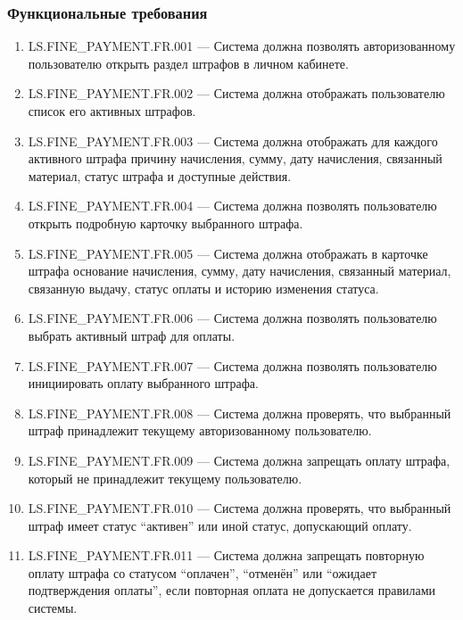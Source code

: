 \documentclass[12pt,a4paper]{article}
\begin{document}
	\subsubsection{Функциональные требования}
	
	\begin{enumerate}
		\item LS.FINE\_PAYMENT.FR.001 --- Система должна позволять авторизованному пользователю
		открыть раздел штрафов в личном кабинете.
		
		\item LS.FINE\_PAYMENT.FR.002 --- Система должна отображать пользователю список его
		активных штрафов.
		
		\item LS.FINE\_PAYMENT.FR.003 --- Система должна отображать для каждого активного штрафа
		причину начисления, сумму, дату начисления, связанный материал, статус штрафа
		и доступные действия.
		
		\item LS.FINE\_PAYMENT.FR.004 --- Система должна позволять пользователю открыть подробную
		карточку выбранного штрафа.
		
		\item LS.FINE\_PAYMENT.FR.005 --- Система должна отображать в карточке штрафа основание
		начисления, сумму, дату начисления, связанный материал, связанную выдачу,
		статус оплаты и историю изменения статуса.
		
		\item LS.FINE\_PAYMENT.FR.006 --- Система должна позволять пользователю выбрать активный
		штраф для оплаты.
		
		\item LS.FINE\_PAYMENT.FR.007 --- Система должна позволять пользователю инициировать
		оплату выбранного штрафа.
		
		\item LS.FINE\_PAYMENT.FR.008 --- Система должна проверять, что выбранный штраф принадлежит
		текущему авторизованному пользователю.
		
		\item LS.FINE\_PAYMENT.FR.009 --- Система должна запрещать оплату штрафа, который не
		принадлежит текущему пользователю.
		
		\item LS.FINE\_PAYMENT.FR.010 --- Система должна проверять, что выбранный штраф имеет
		статус ``активен'' или иной статус, допускающий оплату.
		
		\item LS.FINE\_PAYMENT.FR.011 --- Система должна запрещать повторную оплату штрафа со
		статусом ``оплачен'', ``отменён'' или ``ожидает подтверждения оплаты'', если
		повторная оплата не допускается правилами системы.
		

\end{enumerate}
\end{document}
